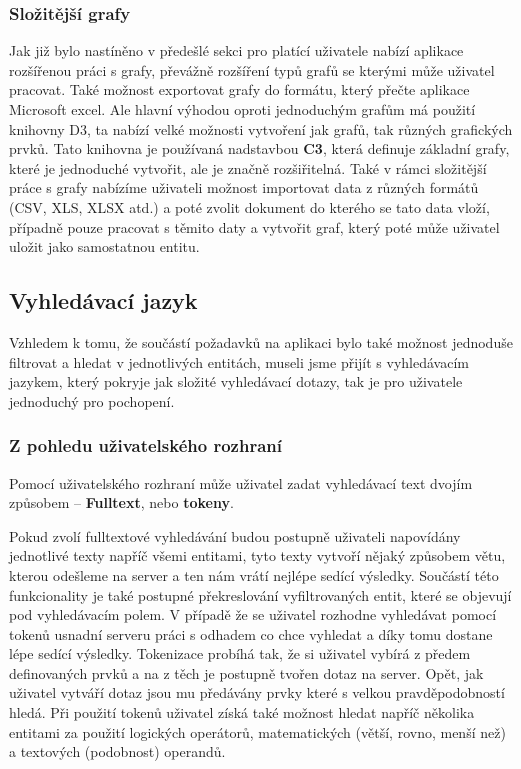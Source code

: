 \subsubsection{Složitější grafy}
\par Jak již bylo nastíněno v předešlé sekci pro platící uživatele nabízí aplikace rozšířenou práci s grafy, převážně rozšíření typů grafů se kterými může uživatel pracovat. Také možnost exportovat grafy do formátu, který přečte aplikace Microsoft excel. Ale hlavní výhodou oproti jednoduchým grafům má použití knihovny D3, ta nabízí velké možnosti vytvoření jak grafů, tak různých grafických prvků. Tato knihovna je používaná nadstavbou \textbf{C3}, která definuje základní grafy, které je jednoduché vytvořit, ale je značně rozšiřitelná. Také v rámci složitější práce s grafy nabízíme uživateli možnost importovat data z různých formátů (CSV, XLS, XLSX atd.) a poté zvolit dokument do kterého se tato data vloží, případně pouze pracovat s těmito daty a vytvořit graf, který poté může uživatel uložit jako samostatnou entitu.

\subsection{Vyhledávací jazyk}
\par Vzhledem k tomu, že součástí požadavků na aplikaci bylo také možnost jednoduše filtrovat a hledat v jednotlivých entitách, museli jsme přijít s vyhledávacím jazykem, který pokryje jak složité vyhledávací dotazy, tak je pro uživatele jednoduchý pro pochopení.

\subsubsection{Z pohledu uživatelského rozhraní}
\par Pomocí uživatelského rozhraní může uživatel zadat vyhledávací text dvojím způsobem -- \textbf{Fulltext}, nebo \textbf{tokeny}.

\par Pokud zvolí fulltextové vyhledávání budou postupně uživateli napovídány jednotlivé texty napříč všemi entitami, tyto texty vytvoří nějaký způsobem větu, kterou odešleme na server a ten nám vrátí nejlépe sedící výsledky. Součástí této funkcionality je také postupné překreslování vyfiltrovaných entit, které se objevují pod vyhledávacím polem. V případě že se uživatel rozhodne vyhledávat pomocí tokenů usnadní serveru práci s odhadem co chce vyhledat a díky tomu dostane lépe sedící výsledky. Tokenizace probíhá tak, že si uživatel vybírá z předem definovaných prvků a na z těch je postupně tvořen dotaz na server. Opět, jak uživatel vytváří dotaz jsou mu předávány prvky které s velkou pravděpodobností hledá. Při použití tokenů uživatel získá také možnost hledat napříč několika entitami za použití logických operátorů, matematických (větší, rovno, menší než) a textových (podobnost) operandů.

